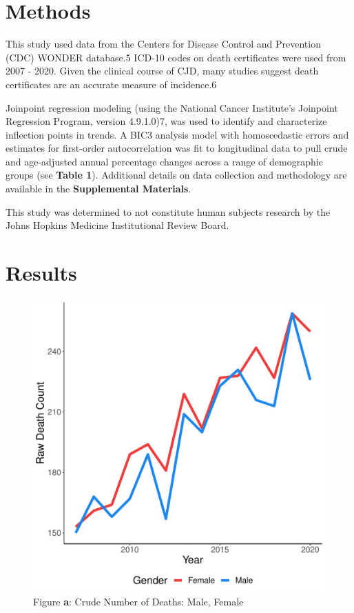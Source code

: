 \documentclass[12pt]{article}
\begin{document}
\section*{Methods}

\par \bigskip
\noindent This study used data from the Centers for Disease Control and Prevention (CDC) WONDER database.5 ICD-10 codes on death certificates were used from 2007 - 2020. Given the clinical course of CJD, many studies suggest death certificates are an accurate measure of incidence.6

\par \bigskip
\noindent Joinpoint regression modeling (using the National Cancer Institute’s Joinpoint Regression Program, version 4.9.1.0)7, was used to identify and characterize inflection points in trends. A BIC3 analysis model with homoscedastic errors and estimates for first-order autocorrelation was fit to longitudinal data to pull crude and age-adjusted annual percentage changes across a range of demographic groups (see \textbf{Table 1}). Additional details on data collection and methodology are available in the \textbf{Supplemental Materials}.

\par \bigskip
\noindent This study was determined to not constitute human subjects research by the Johns Hopkins Medicine Institutional Review Board.

\newpage

\section*{Results}

\begin{figure}
    \centering
    \includegraphics[scale=0.5]{analysis/output/raw_deaths_by_gender_plot.pdf}
    \caption{Figure \textbf{a}: Crude Number of Deaths: Male, Female}
    \label{fig:crude_deaths_by_gender}
\end{figure}
\end{document}
